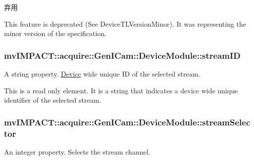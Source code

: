 \begin{DoxyRefDesc}{弃用}
\item[\hyperlink{deprecated__deprecated000101}{弃用}]This feature is deprecated (See Device\+T\+L\+Version\+Minor). It was representing the minor version of the specification. \end{DoxyRefDesc}
\hypertarget{classmv_i_m_p_a_c_t_1_1acquire_1_1_gen_i_cam_1_1_device_module_acefeeecd40406db829ac522bb9a424b8}{
\subsubsection[{stream\+I\+D}]{ mv\+I\+M\+P\+A\+C\+T\+::acquire\+::\+Gen\+I\+Cam\+::\+Device\+Module\+::stream\+I\+D}}\label{classmv_i_m_p_a_c_t_1_1acquire_1_1_gen_i_cam_1_1_device_module_acefeeecd40406db829ac522bb9a424b8}


A string property. \hyperlink{classmv_i_m_p_a_c_t_1_1acquire_1_1_device}{Device} wide unique I\+D of the selected stream. 

This is a read only element. It is a string that indicates a device wide unique identifier of the selected stream. \hypertarget{classmv_i_m_p_a_c_t_1_1acquire_1_1_gen_i_cam_1_1_device_module_a3d38a6668eca0dd5e27bc4f95a00f420}{
\subsubsection[{stream\+Selector}]{ mv\+I\+M\+P\+A\+C\+T\+::acquire\+::\+Gen\+I\+Cam\+::\+Device\+Module\+::stream\+Selector}}\label{classmv_i_m_p_a_c_t_1_1acquire_1_1_gen_i_cam_1_1_device_module_a3d38a6668eca0dd5e27bc4f95a00f420}


An integer property. Selects the stream channel. 

